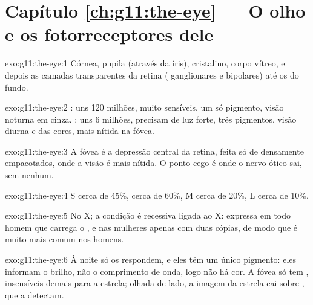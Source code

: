 \section*{Capítulo \ref{ch:g11:the-eye} --- O olho e os fotorreceptores dele}

\begin{solution}{exo:g11:the-eye:1}
Córnea, pupila (através da íris), cristalino, corpo vítreo, e depois as
camadas transparentes da retina ( ganglionares e bipolares) até
os  do fundo.
\end{solution}

\begin{solution}{exo:g11:the-eye:2}
: uns 120 milhões, muito sensíveis, um só pigmento, visão
noturna em cinza. : uns 6 milhões, precisam de luz forte, três
pigmentos, visão diurna e das cores, mais nítida na fóvea.
\end{solution}

\begin{solution}{exo:g11:the-eye:3}
A fóvea é a depressão central da retina, feita só de  densamente
empacotados, onde a visão é mais nítida. O ponto cego é onde o nervo
ótico sai, sem  nenhum.
\end{solution}

\begin{solution}{exo:g11:the-eye:4}
 S cerca de 45\%,  cerca de 60\%,  M cerca de 20\%,
 L cerca de 10\%.
\end{solution}

\begin{solution}{exo:g11:the-eye:5}
No  X; a condição é recessiva ligada ao X: expressa em todo
homem que carrega o , e nas mulheres apenas com duas cópias, de
modo que é muito mais comum nos homens.
\end{solution}

\begin{solution}{exo:g11:the-eye:6}
À noite só os  respondem, e eles têm um único pigmento: eles
informam o brilho, não o comprimento de onda, logo não há cor. A fóvea
só tem , insensíveis demais para a estrela; olhada de lado, a
imagem da estrela cai sobre , que a detectam.
\end{solution}

